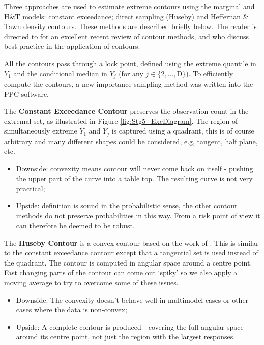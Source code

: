 Three approaches are used to estimate extreme contours using the marginal and H\&T models: constant exceedance; direct sampling (Huseby) and Heffernan \& Tawn density contours. These methods are described briefly below. The reader is directed to \cite{HslEA17} for an excellent recent review of contour methods, and \citep{RssOE19} who discuss best-practice in the application of contours. 

All the contours pass through a lock point, defined using the extreme quantile in $Y_1$ and the conditional median in $Y_j$ (for any $j \in \{2,\ldots,$D$\}$). To efficiently compute the contours, a new importance sampling method was written into the PPC software.

The \textbf{Constant Exceedance Contour} preserves the observation count in the extremal set, as illustrated in Figure \ref{fig:Stg5_ExcDiagram}. The region of simultaneously extreme $Y_1$ and $Y_j$ is captured using a quadrant, this is of course arbitrary and many different shapes could be considered, e.g, tangent, half plane, etc. 
\begin{itemize}
\item Downside: convexity means contour will never come back on itself - pushing the upper part of the curve into a table top. The resulting curve is not very practical;
\item Upside: definition is sound in the probabilistic sense, the other contour methods do not preserve probabilities in this way. From a risk point of view it can therefore be deemed to be robust.
\end{itemize}

The \noindent\textbf{Huseby Contour} is a convex contour based on the work of \cite{HsbEA15a}. This is similar to the constant exceedance contour except that a tangential set is used instead of the quadrant. The contour is computed in angular space around a centre point. Fast changing parts of the contour can come out `spiky' so we also apply a moving average to try to overcome some of these issues. 
\begin{itemize}
	\item Downside: The convexity doesn't behave well in multimodel cases or other cases where the data is non-convex;
	\item Upside: A complete contour is produced - covering the full angular space around its centre point, not just the region with the largest responses. 
\end{itemize}

